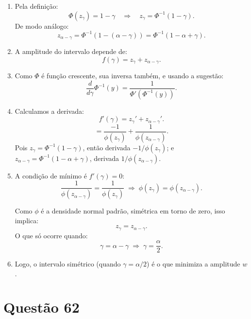 \documentclass[12pt]{article}
\newcommand{\quest}[1]{\section*{Questão #1}} %
\begin{document}
\begin{enumerate}
    \item Pela definição:
    \[
    \Phi(z_{\gamma}) = 1 - \gamma 
    \quad\Rightarrow\quad
    z_{\gamma} = \Phi^{-1}(1 - \gamma).
    \]
    De modo análogo:
    \[
    z_{\alpha - \gamma} = \Phi^{-1}(1 - (\alpha - \gamma)) = \Phi^{-1}(1 - \alpha + \gamma).
    \]
    
    \item A amplitude do intervalo depende de:
    \[
    f(\gamma) = z_{\gamma} + z_{\alpha - \gamma}.
    \]
    
    \item Como \(\Phi\) é função crescente, sua inversa também, e usando a sugestão:
    \[
    \frac{d}{d\gamma} \Phi^{-1}(y) = \frac{1}{\Phi'(\Phi^{-1}(y))}.
    \]
    
    \item Calculamos a derivada:
    \[
    f'(\gamma) = z_{\gamma}' + z_{\alpha - \gamma}'.
    \]
    \[
    = \frac{-1}{\phi(z_{\gamma})} + \frac{1}{\phi(z_{\alpha - \gamma})}.
    \]
    Pois \(z_{\gamma} = \Phi^{-1}(1-\gamma)\), então derivada \(-1/\phi(z_{\gamma})\); e \(z_{\alpha - \gamma} = \Phi^{-1}(1-\alpha+\gamma)\), derivada \(1/\phi(z_{\alpha - \gamma})\).
    
    \item A condição de mínimo é \(f'(\gamma)=0\):
    \[
    \frac{1}{\phi(z_{\alpha - \gamma})} = \frac{1}{\phi(z_{\gamma})} 
    \;\Rightarrow\; 
    \phi(z_{\gamma}) = \phi(z_{\alpha - \gamma}).
    \]
    
    Como \(\phi\) é a densidade normal padrão, simétrica em torno de zero, isso implica:
    \[
    z_{\gamma} = z_{\alpha - \gamma}.
    \]
    O que só ocorre quando:
    \[
    \gamma = \alpha - \gamma \;\Rightarrow\; \gamma = \frac{\alpha}{2}.
    \]
    
    \item Logo, o intervalo simétrico (quando \(\gamma=\alpha/2\)) é o que minimiza a amplitude \(w\).
\end{enumerate}

\quest{62}
\end{document}
